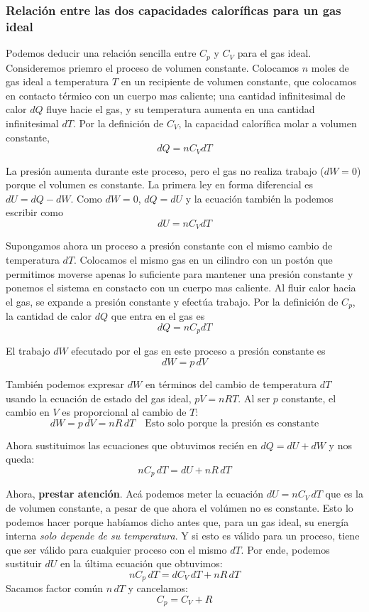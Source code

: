 \documentclass[12pt]{article}
\begin{document}
  \subsubsection{Relación entre las dos capacidades caloríficas para un gas ideal}
  Podemos deducir una relación sencilla entre $ C_{p} $ y $ C_{V} $ para el gas ideal. Consideremos priemro el proceso de volumen constante. Colocamos $ n $ moles de gas ideal a temperatura $ T $ en un recipiente de volumen constante, que colocamos en contacto térmico con un cuerpo mas caliente; una cantidad infinitesimal de calor $ dQ $ fluye hacie el gas, y su temperatura aumenta en una cantidad infinitesimal $ dT $. Por la definición de $ C_{V} $, la capacidad calorífica molar a volumen constante,
  \[
  dQ = nC_{V}dT
  \]

  La presión aumenta durante este proceso, pero el gas no realiza trabajo ($ dW = 0 $) porque el volumen es constante. La primera ley en forma diferencial es $ dU = dQ - dW $. Como $ dW = 0 $, $ dQ = dU $ y la ecuación también la podemos escribir como 
  \[
  dU = nC_{V}dT
  \]

  Supongamos ahora un proceso a presión constante con el mismo cambio de temperatura $ dT $. Colocamos el mismo gas en un cilindro con un postón que permitimos moverse apenas lo suficiente para mantener una presión constante y ponemos el sistema en constacto con un cuerpo mas caliente. Al fluir calor hacia el gas, se expande a presión constante y efectúa trabajo. Por la definición de $ C_{p} $, la cantidad de calor $ dQ $ que entra en el gas es 
  \[
    dQ = nC_{p}dT
  \]

  El trabajo $ dW $ efecutado por el gas en este proceso a presión constante es 
  \[
    dW = p\,dV
  \]

  También podemos expresar $ dW $ en términos del cambio de temperatura $ dT $ usando la ecuación de estado del gas ideal, $ pV = nRT $. Al ser $ p $ constante, el cambio en $ V $ es proporcional al cambio de $ T $:
  \[
  dW = p\,dV = nR\,dT \quad \text{Esto solo porque la presión es constante}
  \]

  Ahora sustituimos las ecuaciones que obtuvimos recién en $ dQ = dU + dW $ y nos queda:
  \[
  nC_{p}\,dT = dU + nR\,dT
  \]

  Ahora, \textbf{prestar atención}. Acá podemos meter la ecuación $ dU = nC_{V}\,dT $ que es la de volumen constante, a pesar de que ahora el volúmen no es constante. Esto lo podemos hacer porque habíamos dicho antes que, para un gas ideal, su energía interna \textit{solo depende de su temperatura}. Y si esto es válido para un proceso, tiene que ser válido para cualquier proceso con el mismo $ dT $. Por ende, podemos sustituir $ dU $ en la última ecuación que obtuvimos:
  \[
    nC_{p}\,dT = dC_{V}\,dT + nR\,dT
  \]
  Sacamos factor común $ n\,dT $ y cancelamos:
  \[
    C_{p} = C_{V} + R
  \]
\end{document}
